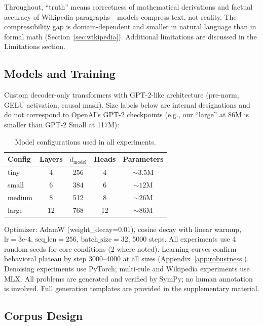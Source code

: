 \documentclass{article}
\begin{document}
Throughout, ``truth'' means correctness of mathematical derivations and factual accuracy of Wikipedia paragraphs---models compress text, not reality. The compressibility gap is domain-dependent and smaller in natural language than in formal math (Section~\ref{sec:wikipedia}). Additional limitations are discussed in the Limitations section.

\subsection{Models and Training}
\label{sec:models}

Custom decoder-only transformers with GPT-2-like architecture (pre-norm, GELU activation, causal mask). Size labels below are internal designations and do not correspond to OpenAI's GPT-2 checkpoints (e.g., our ``large'' at 86M is smaller than GPT-2 Small at 117M):

\begin{table}[h]
\centering
\small
\begin{tabular}{lcccc}
\toprule
Config & Layers & $d_{\text{model}}$ & Heads & Parameters \\
\midrule
tiny   & 4  & 256 & 4  & ${\sim}3.5$M \\
small  & 6  & 384 & 6  & ${\sim}12$M \\
medium & 8  & 512 & 8  & ${\sim}26$M \\
large  & 12 & 768 & 12 & ${\sim}86$M \\
\bottomrule
\end{tabular}
\caption{Model configurations used in all experiments.}
\label{tab:models}
\end{table}

Optimizer: AdamW (weight\_decay=0.01), cosine decay with linear warmup, $\text{lr}=3\text{e-}4$, $\text{seq\_len}=256$, $\text{batch\_size}=32$, 5000 steps. All experiments use 4 random seeds for core conditions (2 where noted). Learning curves confirm behavioral plateau by step 3000--4000 at all sizes (Appendix~\ref{app:robustness}). Denoising experiments use PyTorch; multi-rule and Wikipedia experiments use MLX. All problems are generated and verified by SymPy; no human annotation is involved. Full generation templates are provided in the supplementary material.

\subsection{Corpus Design}
\label{sec:corpus}
\end{document}
